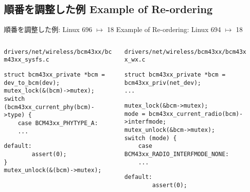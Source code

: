 \subsection{順番を調整した例 Example of Re-ordering}
\begin{frame}[fragile]{順番を調整した例: Linux 696 $\mapsto$ 18}
{Example of Re-ordering: Linux 694 $\mapsto$ 18}
\begin{columns}
\begin{column}{11em}
\texttt{\tiny drivers/net/wireless/bcm43xx/bcm43xx\_sysfs.c}
\begin{lstlisting}[firstnumber=347]
struct bcm43xx_private *bcm = dev_to_bcm(dev);
mutex_lock(&(bcm)->mutex);
switch (bcm43xx_current_phy(bcm)->type) {
    case BCM43xx_PHYTYPE_A:
    ...
\end{lstlisting}
\begin{lstlisting}[firstnumber=362]
    default:
        assert(0);
}
mutex_unlock(&(bcm)->mutex);
\end{lstlisting}
\end{column}
\begin{column}{13em}
\texttt{\tiny drivers/net/wireless/bcm43xx/bcm43xx\_wx.c}
\begin{lstlisting}[firstnumber=615]
struct bcm43xx_private *bcm = bcm43xx_priv(net_dev);
...
\end{lstlisting}
\begin{lstlisting}[firstnumber=618]
mutex_lock(&bcm->mutex);
mode = bcm43xx_current_radio(bcm)->interfmode;
mutex_unlock(&bcm->mutex);
switch (mode) {
    case BCM43xx_RADIO_INTERFMODE_NONE:
    ...
\end{lstlisting}
\begin{lstlisting}[firstnumber=632]
    default:
        assert(0);
\end{lstlisting}
\end{column}
\end{columns}
\end{frame}
